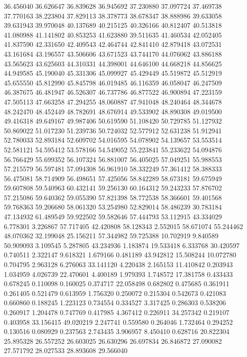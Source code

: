 36.456040
36.626647
36.839628
36.945692
37.230880
37.097724
37.469738
37.770163
38.223804
37.829113
38.378773
38.678347
38.888986
39.633058
39.631943
39.970048
40.137689
40.215125
40.326166
40.812407
40.513818
41.080988
41.141802
40.853253
41.623880
39.511635
41.460534
42.052405
41.837590
42.331650
42.409543
42.464744
42.841410
42.879418
43.072531
43.161684
43.196557
43.506606
43.671523
43.744170
44.076062
43.886188
43.565623
43.625603
44.310331
44.398001
44.646100
44.668218
44.856625
44.949585
45.190040
45.331306
45.099927
45.429449
45.519872
45.512919
45.655550
45.812990
45.845798
46.019485
46.116359
46.058047
46.247509
46.387675
46.481947
46.526307
46.737786
46.877522
46.900894
47.223159
47.505113
47.663258
47.294255
48.060887
47.941048
48.240464
48.344678
48.242470
48.452449
48.782691
48.676914
49.533902
48.890308
49.019500
49.416318
49.649167
49.987406
50.619590
51.108420
50.729785
51.127932
50.869022
51.017230
51.239736
50.724032
52.577912
52.631238
51.912941
52.780033
52.893184
52.609702
54.016595
54.078902
54.139657
53.553514
52.581121
54.595412
53.578166
54.549052
55.223841
55.233622
54.094876
56.766429
55.699352
56.107324
56.881007
56.405025
57.049251
55.988553
57.215579
56.597481
57.094308
56.961910
58.332249
57.361412
58.388333
56.475081
58.714909
56.498651
57.425056
58.842289
58.673181
59.675949
59.607808
59.540963
60.432141
59.256130
60.164312
59.243233
57.876702
57.215086
59.640362
59.055390
57.821398
58.772538
58.366601
59.401568
59.768363
59.206680
58.061320
53.254980
52.829014
58.486239
30.783184
47.134932
61.489549
59.922502
59.582646
57.444793
53.112915
43.334029
6.778301
3.226867
57.717405
42.420808
58.128343
2.552015
58.671074
55.244462
48.070362
32.199048
25.156211
57.344982
59.725388
10.702919
9.840589
50.909093
3.109545
5.287805
43.234936
1.183874
19.533418
6.333768
30.420597
0.740511
2.322147
9.618321
1.679166
0.481189
43.942812
15.508244
10.072780
0.704795
2.963128
6.276063
33.141120
4.220438
2.165153
11.410842
0.203943
1.034959
4.026739
22.470601
4.400189
1.979393
1.748572
17.381758
0.433433
0.678245
0.110098
0.160025
0.374717
22.058498
0.682802
0.475685
0.361911
0.261405
0.521479
0.613959
1.756320
0.250072
0.215304
0.542673
0.421083
0.660860
0.188245
1.223123
0.734554
0.334527
3.317425
0.286303
0.538206
0.260917
1.204478
0.747769
0.417985
4.367412
0.226911
34.257342
0.219107
0.403958
33.156415
49.020219
2.247741
0.559580
0.264046
1.732464
0.294252
0.130516
0.080929
0.237563
2.743435
3.906957
8.450410
0.628716
20.822304
25.895328
26.557252
26.603025
26.630296
26.697834
26.846872
27.090082
27.571792
28.027533
28.893608
29.566040
